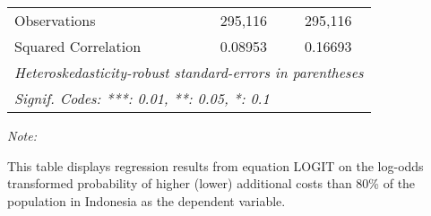 \begin{table}[htbp!]
\begin{adjustbox}{width = 1\textwidth, max height = 0.95\textheight, center}
\begin{threeparttable}[b]
\begin{tabular}{lcc}
            Observations         & 295,116        & 295,116\\  
            Squared Correlation  & 0.08953        & 0.16693\\  
            \midrule \midrule
            \multicolumn{3}{l}{\emph{Heteroskedasticity-robust standard-errors in parentheses}}\\
            \multicolumn{3}{l}{\emph{Signif. Codes: ***: 0.01, **: 0.05, *: 0.1}}\\
         \end{tabular}
         
         \begin{tablenotes}\item \medskip \textit{Note:}
            \item This table displays regression results from equation LOGIT on the log-odds transformed probability of higher (lower) additional costs than 80\% of the population in Indonesia as the dependent variable. 
         \end{tablenotes}
      \end{threeparttable}
   \end{adjustbox}
\end{table}



